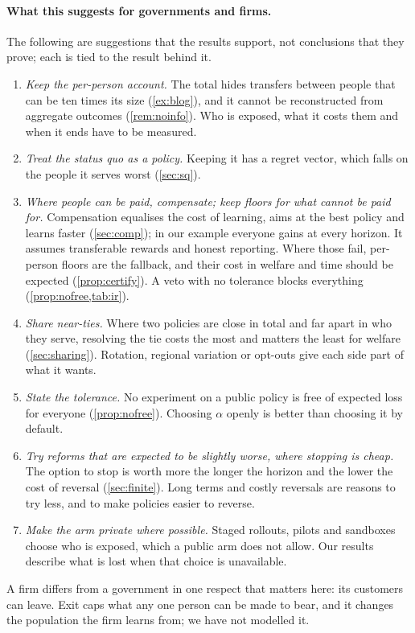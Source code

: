 \documentclass[11pt,a4paper]{article}
\theoremstyle{plain}
\theoremstyle{definition}
\theoremstyle{remark}
\begin{document}
\paragraph{What this suggests for governments and firms.} The following are suggestions that the results support, not conclusions that they prove; each is tied to the result behind it.
\begin{enumerate}[leftmargin=*,itemsep=2pt]
  \item \emph{Keep the per-person account.} The total hides transfers between people that can be ten times its size (\cref{ex:blog}), and it cannot be reconstructed from aggregate outcomes (\cref{rem:noinfo}). Who is exposed, what it costs them and when it ends have to be measured.
  \item \emph{Treat the status quo as a policy.} Keeping it has a regret vector, which falls on the people it serves worst (\cref{sec:sq}).
  \item \emph{Where people can be paid, compensate; keep floors for what cannot be paid for.} Compensation equalises the cost of learning, aims at the best policy and learns faster (\cref{sec:comp}); in our example everyone gains at every horizon. It assumes transferable rewards and honest reporting. Where those fail, per-person floors are the fallback, and their cost in welfare and time should be expected (\cref{prop:certify}). A veto with no tolerance blocks everything (\cref{prop:nofree,tab:ir}).
  \item \emph{Share near-ties.} Where two policies are close in total and far apart in who they serve, resolving the tie costs the most and matters the least for welfare (\cref{sec:sharing}). Rotation, regional variation or opt-outs give each side part of what it wants.
  \item \emph{State the tolerance.} No experiment on a public policy is free of expected loss for everyone (\cref{prop:nofree}). Choosing $\alpha$ openly is better than choosing it by default.
  \item \emph{Try reforms that are expected to be slightly worse, where stopping is cheap.} The option to stop is worth more the longer the horizon and the lower the cost of reversal (\cref{sec:finite}). Long terms and costly reversals are reasons to try less, and to make policies easier to reverse.
  \item \emph{Make the arm private where possible.} Staged rollouts, pilots and sandboxes choose who is exposed, which a public arm does not allow. Our results describe what is lost when that choice is unavailable.
\end{enumerate}
A firm differs from a government in one respect that matters here: its customers can leave. Exit caps what any one person can be made to bear, and it changes the population the firm learns from; we have not modelled it.
\end{document}
